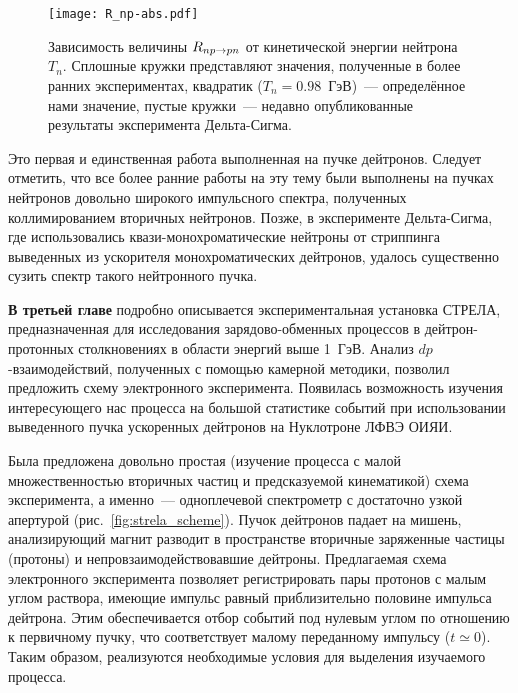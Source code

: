 \begin{figure}[h]
  \centering
  \vspace{-1ex}
  \texttt{[image: R\_np-abs.pdf]}
  \vspace{-2ex}
  \caption{Зависимость величины $R_{np \rightarrow pn}$ от кинетической энергии нейтрона
    $T_n$. Сплошные кружки представляют значения, полученные в более ранних
    экспериментах, квадратик ($T_n = 0.98$~ГэВ)~--- определённое нами значение,
    пустые кружки~--- недавно опубликованные результаты эксперимента
    Дельта-Сигма.}
  \label{fig:R_np}
\end{figure}

Это первая и единственная работа выполненная на пучке дейтронов. Следует
отметить, что все более ранние работы на эту тему были выполнены на пучках
нейтронов довольно широкого импульсного спектра, полученных коллимированием
вторичных нейтронов. Позже, в эксперименте Дельта-Сигма, где использовались
квази-монохроматические нейтроны от стриппинга выведенных из ускорителя
монохроматических дейтронов, удалось существенно сузить спектр такого
нейтронного пучка.

\vspace{1ex}
\textbf{В третьей главе} подробно описывается экспериментальная установка
СТРЕЛА, предназначенная для исследования зарядово-обменных процессов в
дейтрон-протонных столкновениях в области энергий выше 1~ГэВ. Анализ
$dp$-взаимодействий, полученных с помощью камерной методики, позволил предложить
схему электронного эксперимента. Появилась возможность изучения интересующего
нас процесса на большой статистике событий при использовании выведенного пучка
ускоренных дейтронов на Нуклотроне ЛФВЭ ОИЯИ.

Была предложена довольно простая (изучение процесса с малой множественностью
вторичных частиц и предсказуемой кинематикой) схема эксперимента,
а именно~--- одноплечевой спектрометр с достаточно узкой апертурой
(рис.~\ref{fig:strela_scheme}). Пучок дейтронов падает на мишень, анализирующий
магнит разводит в пространстве вторичные заряженные частицы (протоны) и
непровзаимодействовавшие дейтроны. Предлагаемая схема электронного эксперимента
позволяет регистрировать пары протонов с малым углом раствора, имеющие импульс
равный приблизительно половине импульса дейтрона. Этим обеспечивается отбор
событий под нулевым углом по отношению к первичному пучку, что соответствует
малому переданному импульсу ($t \simeq 0$). Таким образом, реализуются
необходимые условия для выделения изучаемого процесса.

